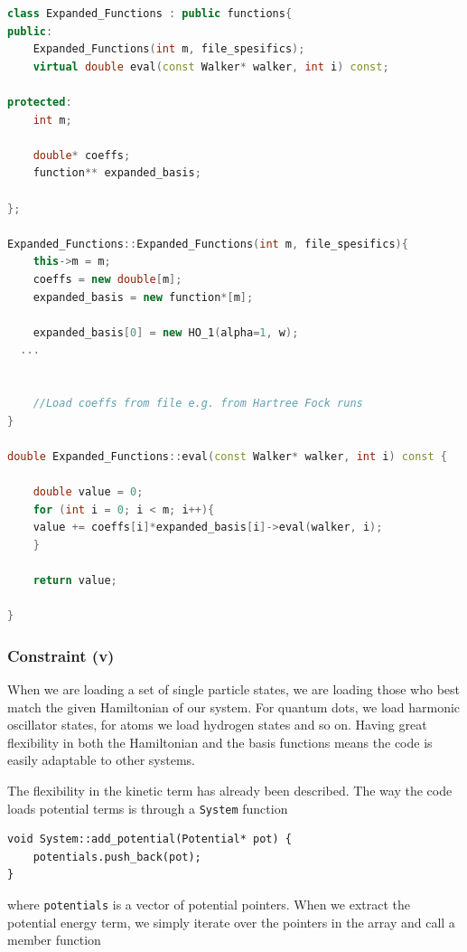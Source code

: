 \vspace{0.5cm}
\begin{lstlisting}[language=C++]
class Expanded_Functions : public functions{
public:
    Expanded_Functions(int m, file_spesifics);
    virtual double eval(const Walker* walker, int i) const;

protected:
    int m;                     
  
    double* coeffs;            
    function** expanded_basis;
  
};

Expanded_Functions::Expanded_Functions(int m, file_spesifics){
    this->m = m;
    coeffs = new double[m];
    expanded_basis = new function*[m];
  
    expanded_basis[0] = new HO_1(alpha=1, w);
  ...
  
  
    //Load coeffs from file e.g. from Hartree Fock runs
}

double Expanded_Functions::eval(const Walker* walker, int i) const {
    
    double value = 0;
    for (int i = 0; i < m; i++){
	value += coeffs[i]*expanded_basis[i]->eval(walker, i);
    }

    return value;

}
\end{lstlisting}


\subsubsection{Constraint (v)}

When we are loading a set of single particle states, we are loading those who best match the given Hamiltonian of our system. For quantum dots, we load harmonic oscillator states, for atoms we load hydrogen states and so on. Having great flexibility in both the Hamiltonian and the basis functions means the code is easily adaptable to other systems. 

The flexibility in the kinetic term has already been described. The way the code loads potential terms is through a \verb+System+ function 

\vspace{0.5cm}
\begin{lstlisting}
void System::add_potential(Potential* pot) {
    potentials.push_back(pot);
}
\end{lstlisting}

where \verb+potentials+ is a vector of potential pointers. When we extract the potential energy term, we simply iterate over the pointers in the array and call a member function

